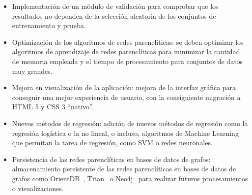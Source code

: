 \begin{itemize}
	
	\item Implementación de un módulo de validación para comprobar que los resultados no dependen de la selección aleatoria de los conjuntos de entrenamiento y prueba. 
	
	\item Optimización de los algoritmos de redes parenclíticas: se deben optimizar los algoritmos de aprendizaje de redes parenclíticas para minimizar la cantidad de memoria empleada y el tiempo de procesamiento para conjuntos de datos muy grandes.
	 
	\item Mejora en visualización de la aplicación: mejora de la interfaz gráfica para conseguir una mejor experiencia de usuario, con la consiguiente migración a HTML 5 y CSS 3 ``nativo''.
	
	\item Nuevos métodos de regresión: adición de nuevos métodos de regresión como la regresión logística o la no lineal, o incluso, algoritmos de Machine Learning que permitan la tarea de regresión, como SVM o redes neuronales.
	
	\item Persistencia de las redes parenclíticas en bases de datos de grafos: almacenamiento persistente de las redes parenclíticas en bases de datos de grafos como OrientDB~\cite{orientdb}, Titan~\cite{titan} o Neo4j~\cite{neo4j} para realizar futuros procesamientos o visualizaciones.
\end{itemize}